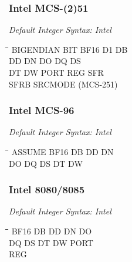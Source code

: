 \subsubsection{Intel MCS-(2)51}

{\em Default Integer Syntax: Intel}

{\tt\begin{tabbing}
\hspace{3cm}\=\hspace{3cm}\=\hspace{3cm}\=\hspace{3cm}\=\kill
BIGENDIAN  \> BIT         \> BF16        \> D1          \> DB \\
DD         \> DN          \> DO          \> DQ          \> DS \\
DT         \> DW          \> PORT        \> REG         \> SFR \\
SFRB       \> SRCMODE (MCS-251) \\
\end{tabbing}}

\subsubsection{Intel MCS-96}

{\em Default Integer Syntax: Intel}

{\tt\begin{tabbing}
\hspace{3cm}\=\hspace{3cm}\=\hspace{3cm}\=\hspace{3cm}\=\kill
ASSUME     \> BF16        \> DB          \> DD          \> DN \\
DO         \> DQ          \> DS          \> DT          \> DW \\
\end{tabbing}}
 
\subsubsection{Intel 8080/8085}

{\em Default Integer Syntax: Intel}

{\tt\begin{tabbing}
\hspace{3cm}\=\hspace{3cm}\=\hspace{3cm}\=\hspace{3cm}\=\kill
BF16       \> DB          \> DD          \> DN          \> DO \\
DQ         \> DS          \> DT          \> DW          \> PORT \\
REG \\
\end{tabbing}}

